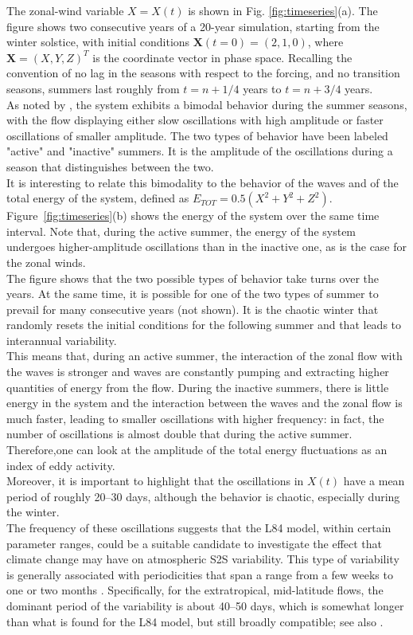 \documentclass[%
 aip, cha,
 amsmath,amssymb,
 reprint,%
author-year,%
]{revtex4-1}
\newcommand{\X}{\mathbf X}
\newcommand{\0}{\mathbf 0}
\begin{document}
The zonal-wind variable $X = X(t)$ is shown in Fig. \ref{fig:timeseries}(a). The figure shows two consecutive years of a 20-year simulation, starting from the winter solstice, with initial conditions ${\X(t = 0)} = (2, 1, 0)$, where ${\X} = (X, Y, Z)^T$ is the coordinate vector in phase space. Recalling the convention of no lag in the seasons with respect to the forcing, and no transition seasons, summers last roughly from $t = n + 1/4$ years to $t = n + 3/4$ years.  \\
As noted by \cite{lorenz90}, the system exhibits a bimodal behavior during the summer seasons, with the flow displaying either slow oscillations with high amplitude or faster oscillations of smaller amplitude. The two types of behavior have been labeled "active" and "inactive" summers. It is the amplitude of the oscillations during a season that distinguishes between the two. \\
It is interesting to relate this bimodality to the behavior of the waves and of the total energy of the system, defined as $E_{TOT} = 0.5(X^2+Y^2+Z^2)$. Figure~\ref{fig:timeseries}(b) shows the energy of the system over the same time interval. Note that, during the active summer, the energy of the system undergoes higher-amplitude oscillations than in the inactive one, as is the case for the zonal winds. \\
The figure shows that the two possible types of behavior take turns over the years. At the same time, it is possible for one of the two types of summer to prevail for many consecutive years (not shown). It is the chaotic winter that randomly resets the initial conditions for the following summer and that leads to interannual variability. \\
This means that, during an active summer, the interaction of the zonal flow with the waves is stronger and waves are constantly pumping and extracting higher quantities of energy from the flow. During the inactive summers, there is little energy in the system and the interaction between the waves and the zonal flow is much faster, leading to smaller oscillations with higher frequency: in fact, the number of oscillations is almost double that during the active summer. Therefore,one can look at the amplitude of the total energy fluctuations as an index of eddy activity. 
\\
Moreover, it is important to highlight that the oscillations in $X(t)$ have a mean period of roughly 20--30 days, although the behavior is chaotic, especially during the winter. \\ 
The frequency of these oscillations suggests that the L84 model, within certain parameter ranges, could be a suitable candidate to investigate the effect that climate change may have on atmospheric S2S variability. This type of variability is generally associated with periodicities that span a range from a few weeks to one or two months \citep{ghil_S2S, vitart2019introduction}. Specifically, for the extratropical, mid-latitude flows, the dominant period of the variability is about 40--50 days, which is somewhat longer than what is found for the L84 model, but still broadly compatible; see also \citet[Sec.~E.3]{Ghil.Lucar.2020}.
\end{document}
